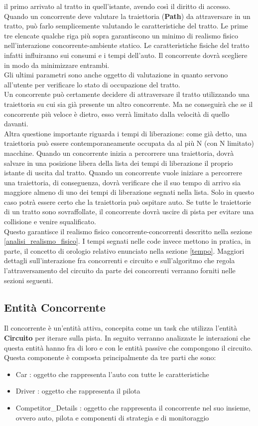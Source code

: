 il primo arrivato al tratto in quell'istante, avendo così
il diritto di accesso.\\
Quando un concorrente deve valutare la traiettoria (\textbf{Path}) da
attraversare in un tratto, può farlo semplicemente valutando le caratteristiche
del tratto. Le prime tre elencate qualche riga più sopra garantiscono un minimo
di realismo fisico nell'interazione concorrente-ambiente statico. Le caratteristiche fisiche del tratto infatti
influiranno sui consumi e i tempi dell'auto. Il concorrente dovrà scegliere in
modo da minimizzare entrambi.\\
Gli ultimi parametri sono anche oggetto di valutazione in quanto servono all'utente per
verificare lo stato di occupazione del tratto.\\
Un concorrente può certamente decidere di attraversare il tratto utilizzando una traiettoria
su cui sia già presente un altro concorrente. Ma ne conseguirà che se il concorrente
più veloce è dietro, esso verrà limitato dalla velocità di quello davanti.\\
Altra questione importante riguarda i tempi di liberazione: come già detto, una
traiettoria può essere contemporaneamente occupata da al più N (con N limitato) macchine.
Quando un concorrente inizia a percorrere una traiettoria, dovrà salvare in una posizione
libera della lista dei tempi di liberazione il proprio istante di uscita dal tratto.
Quando un concorrente vuole iniziare a percorrere una traiettoria, di conseguenza, dovrà verificare
che il suo tempo di arrivo sia maggiore almeno di uno dei tempi di liberazione segnati
nella lista. Solo in questo caso potrà essere certo che la traiettoria può ospitare auto.
Se tutte le traiettorie di un tratto sono sovraffollate, il concorrente dovrà
uscire di pista per evitare una collisione e venire squalificato.\\
Questo garantisce il realismo fisico
concorrente-concorrenti descritto nella sezione \ref{analisi_realismo_fisico}.
I tempi segnati nelle code invece mettono in pratica, in parte, il concetto di
orologio relativo enunciato nella sezione \ref{tempo}.
Maggiori dettagli sull'interazione fra concorrenti e circuito e sull'algoritmo
che regola l'attraversamento del circuito da parte dei concorrenti
verranno forniti nelle sezioni seguenti.
\subsection{Entit\`{a} Concorrente}
Il concorrente è un'entità attiva, concepita
come un task che utilizza l'entità \textbf{Circuito} per iterare sulla pista. In
seguito
verranno analizzate le interazioni che questa entità hanno fra di loro e con le
entità passive che compongono il circuito.
Questa componente è composta principalmente da tre parti che sono:
\begin{itemize}
\item Car : oggetto che rappresenta l'auto con tutte le caratteristiche
\item Driver : oggetto che rappresenta il pilota
\item Competitor\_Details : oggetto che rappresenta il concorrente nel suo
insieme, ovvero auto, pilota e componenti di strategia e di monitoraggio
\end{itemize}
